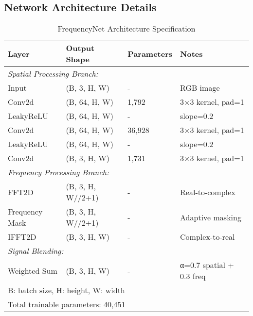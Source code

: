 \documentclass{article}
\begin{document}
\subsection{Network Architecture Details}
\begin{table}[h]
\centering
\caption{FrequencyNet Architecture Specification}
\begin{tabular}{llll}
\toprule
\textbf{Layer} & \textbf{Output Shape} & \textbf{Parameters} & \textbf{Notes} \\
\midrule
\multicolumn{4}{l}{\textit{Spatial Processing Branch:}} \\
\midrule
Input & (B, 3, H, W) & - & RGB image \\
Conv2d & (B, 64, H, W) & 1,792 & 3×3 kernel, pad=1 \\
LeakyReLU & (B, 64, H, W) & - & slope=0.2 \\
Conv2d & (B, 64, H, W) & 36,928 & 3×3 kernel, pad=1 \\
LeakyReLU & (B, 64, H, W) & - & slope=0.2 \\
Conv2d & (B, 3, H, W) & 1,731 & 3×3 kernel, pad=1 \\
\midrule
\multicolumn{4}{l}{\textit{Frequency Processing Branch:}} \\
\midrule
FFT2D & (B, 3, H, W//2+1) & - & Real-to-complex \\
Frequency Mask & (B, 3, H, W//2+1) & - & Adaptive masking \\
IFFT2D & (B, 3, H, W) & - & Complex-to-real \\
\midrule
\multicolumn{4}{l}{\textit{Signal Blending:}} \\
\midrule
Weighted Sum & (B, 3, H, W) & - & α=0.7 spatial + 0.3 freq \\
\bottomrule
\multicolumn{4}{l}{B: batch size, H: height, W: width} \\
\multicolumn{4}{l}{Total trainable parameters: 40,451} \\
\end{tabular}
\label{tab:architecture}
\end{table}
\end{document}
